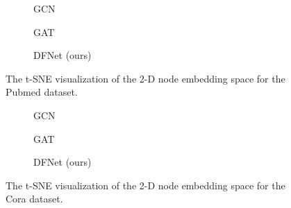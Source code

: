 \documentclass{article}
\begin{document}
\begin{comment}
\begin{figure}[h]
    \centering
    \fbox{\texttt{[image: images/embeddings/pubmed/GCN\_hidden\_embeddings.png]}}
    \fbox{\texttt{[image: images/embeddings/pubmed/GAT\_hidden\_embeddings.png]}}
    \fbox{\texttt{[image: images/embeddings/pubmed/ARMA\_hidden\_embeddings.png]}}
    \caption{The t-SNE visualization of the 2-D node embedding space for the Pubmed dataset in GCN, GAT, and Our method.}
    \label{fig:pubmedEmbeddings}
\end{figure}
\end{comment}

\begin{figure}[h]
  \centering\vspace{-0.2cm}
  \begin{subfigure}[b]{0.32\linewidth}
    \caption{GCN}
  \end{subfigure} 
  \begin{subfigure}[b]{0.32\linewidth}
    \caption{GAT}
  \end{subfigure}
  \begin{subfigure}[b]{0.32\linewidth}
    \caption{DFNet (ours)}
  \end{subfigure}
  \caption{The t-SNE visualization of the 2-D node embedding space for the Pubmed dataset.}
  \label{fig:pubmedEmbeddings}
  \centering
  \begin{subfigure}[b]{0.32\linewidth}
    \caption{GCN}
  \end{subfigure} 
  \begin{subfigure}[b]{0.32\linewidth}
    \caption{GAT}
  \end{subfigure}
  \begin{subfigure}[b]{0.32\linewidth}
    \caption{DFNet (ours)}
  \end{subfigure}
  \caption{The t-SNE visualization of the 2-D node embedding space for the Cora dataset.}
  \label{fig:coraEmbeddings}
\end{figure}
\end{document}
